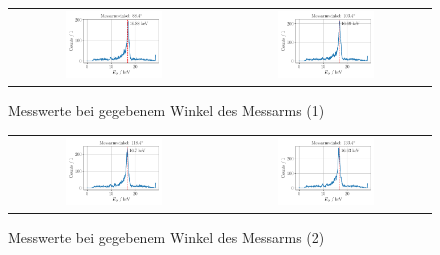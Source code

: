 \documentclass[ngerman]{scrartcl}
\begin{document}
\begin{figure}[H]
\begin{tabular}{cc}
        \includegraphics[width=0.48\textwidth]{../plots/energie_spektren_5.pdf} &
        \includegraphics[width=0.48\textwidth]{../plots/energie_spektren_6.pdf}   \\
    \end{tabular}
    \caption{Messwerte bei gegebenem Winkel des Messarms (1)}
    \label{fig:compton_uebersicht1}
\end{figure}
\begin{figure}[H]
    \centering
    \begin{tabular}{cc}
        \includegraphics[width=0.48\textwidth]{../plots/energie_spektren_7.pdf} &
        \includegraphics[width=0.48\textwidth]{../plots/energie_spektren_8.pdf}   \\
    \end{tabular}
    \caption{Messwerte bei gegebenem Winkel des Messarms (2)}
    \label{fig:compton_uebersicht2}
\end{figure}
\end{document}
